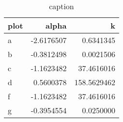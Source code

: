 \begin{table}[ht]
\centering
\begin{tabular}{lrr}
  \hline
plot & alpha & k \\ 
  \hline
a & -2.6176507 & 0.6341345 \\ 
  b & -0.3812498 & 0.0021506 \\ 
  c & -1.1623482 & 37.4616016 \\ 
  d & 0.5600378 & 158.5629462 \\ 
  f & -1.1623482 & 37.4616016 \\ 
  g & -0.3954554 & 0.0250000 \\ 
   \hline
\end{tabular}
\caption{caption} 
\label{tab:fitting_insideLambda_uniform_phi0_nm400_dynamic_randomBipartite_allowUnlinked}
\end{table}
